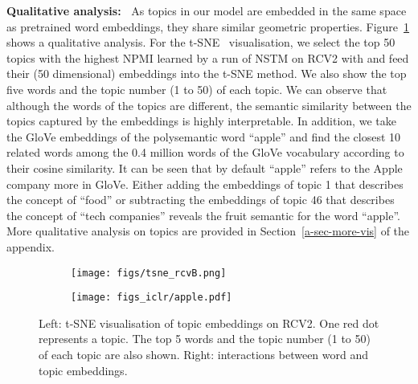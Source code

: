 \documentclass{article}
\begin{document}
\textbf{Qualitative analysis:~}
As topics in our model are embedded in the same space as pretrained word embeddings, they share similar geometric properties.
Figure~\ref{fig-vis} shows a qualitative analysis.
For the t-SNE~\citep{maaten2008visualizing} visualisation, we select the top 50 topics with the highest NPMI learned by a run of NSTM on RCV2 with  and feed their (50 dimensional) embeddings into the t-SNE method.
We also show the top five words and the topic number (1 to 50) of each topic. We can observe that although the words of the topics are different, the semantic similarity between the topics captured by the embeddings is highly interpretable.
In addition, we take the GloVe embeddings of the polysemantic word ``apple'' and find the closest 10 related words among the 0.4 million words of the GloVe vocabulary according to their cosine similarity. It can be seen that by default ``apple'' refers to the Apple company more in GloVe. Either adding the embeddings of topic 1 that describes the concept of ``food'' or subtracting the embeddings of topic 46 that describes the concept of ``tech companies'' reveals the fruit semantic for the word ``apple''.
More qualitative analysis on topics are provided in Section~\ref{a-sec-more-vis} of the appendix.





\begin{figure}
\centering
\begin{subfigure}[b]{0.64\linewidth}
                 \centering
                 \texttt{[image: figs/tsne\_rcvB.png]}
         \end{subfigure}\begin{subfigure}[b]{0.36\linewidth}
                 \centering
                 \texttt{[image: figs\_iclr/apple.pdf]}
         \end{subfigure} 
\caption{Left: t-SNE visualisation of topic embeddings on RCV2. One red dot represents a topic. The top 5 words and the topic number (1 to 50) of each topic are also shown. Right: interactions between word and topic embeddings.}
\label{fig-vis}
\end{figure}
\end{document}
